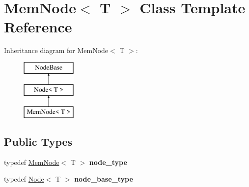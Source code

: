 \hypertarget{classMemNode}{}\section{Mem\+Node$<$ T $>$ Class Template Reference}
\label{classMemNode}
Inheritance diagram for Mem\+Node$<$ T $>$\+:\begin{figure}[H]
\begin{center}
\leavevmode
\includegraphics[height=3.000000cm]{classMemNode}
\end{center}
\end{figure}
\subsection*{Public Types}
\begin{DoxyCompactItemize}
\item 
\mbox{\label{classMemNode_a9a0a54b65bdc57ad10aff072781f7461}} 
typedef \mbox{\hyperlink{classMemNode}{Mem\+Node}}$<$ T $>$ {\bfseries node\+\_\+type}
\item 
\mbox{\label{classMemNode_ae9243d8869247f488b2996cb84a723ed}} 
typedef \mbox{\hyperlink{classNode}{Node}}$<$ T $>$ {\bfseries node\+\_\+base\+\_\+type}
\end{DoxyCompactItemize}
